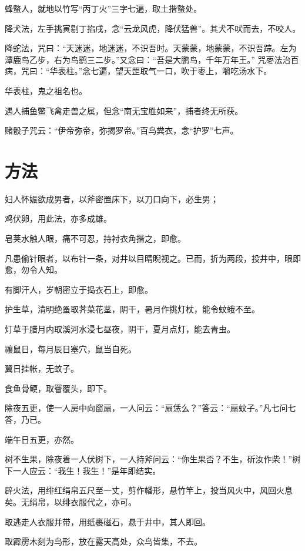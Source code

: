 \documentclass[a4paper,12pt,UTF8,twoside]{ctexbook}
\begin{document}
    蜂螫人，就地以竹写“丙丁火”三字七遍，取土揩螫处。
    
    降犬法，左手挑寅剔丁掐戌，念“云龙风虎，降伏猛兽”。其犬不吠而去，不咬人。
    
    降蛇法，咒曰：“天迷迷，地迷迷，不识吾时。天蒙蒙，地蒙蒙，不识吾踪。左为潭鹿鸟乙步，右为鸟鹞三二步。”又念曰：“吾是大鹏鸟，千年万年王。” 咒枣法治百病，咒曰：“华表柱。”念七遍，望天罡取气一口，吹于枣上，嚼吃汤水下。
    
    华表柱，鬼之祖名也。
    
    遇人捕鱼鳖飞禽走兽之属，但念“南无宝胜如来”，捕者终无所获。
    
    赌骰子咒云：“伊帝弥帝，弥揭罗帝。”百鸟粪衣，念“护罗”七声。
    
    \chapter{方法}
    
    妇人怀娠欲成男者，以斧密置床下，以刀口向下，必生男；
    
    鸡伏卵，用此法，亦多成雄。
    
    皂荚水触人眼，痛不可忍，持衬衣角揩之，即愈。
    
    凡患偷针眼者，以布针一条，对井以目睛睨视之。已而，折为两段，投井中，眼即愈，勿令人知。
    
    有脚汗人，岁朝密立于捣衣石上，即愈。
    
    护生草，清明绝蚤取荠菜花茎，阴干，暑月作挑灯杖，能令蚊蛾不至。
    
    灯草于腊月内取溪河水浸七昼夜，阴干，夏月点灯，能去青虫。
    
    禳鼠日，每月辰日塞穴，鼠当自死。
    
    翼日挂帐，无蚊子。
    
    食鱼骨鲠，取罾覆头，即下。
    
    除夜五更，使一人房中向窗扇，一人问云：“扇恁么？”答云：“扇蚊子。”凡七问七答，乃已。
    
    端午日五更，亦然。
    
    树不生果，除夜着一人伏树下，一人持斧问云：“你生果否？不生，斫汝作柴！”树下一人应云：“我生！我生！”是年即结实。
    
    辟火法，用绯红绢帛五尺至一丈，剪作幡形，悬竹竿上，投当风火中，风回火息矣。无绢帛，以绯衣服代之，亦可。
    
    取逃走人衣服并带，用纸裹磁石，悬于井中，其人即回。
    
    取霹雳木刻为鸟形，放在露天高处，众鸟皆集，不去。
    
\end{document}
